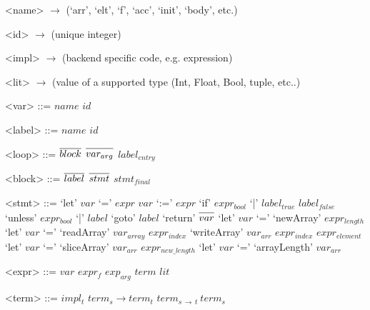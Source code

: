 \documentclass[preamble.tex]{subfiles}
\begin{document}

\setlength{\grammarindent}{5em} %
\renewcommand{\syntleft}{\normalfont\itshape} %
\renewcommand{\syntright}{}
\renewcommand{\litleft}{\ttfamily} %
\renewcommand{\litright}{}
\newcommand{\many}[1]{\overline{#1\vphantom{dummy}}} %

\renewcommand\t[1]{\mathit{#1}}

\setlength{\grammarparsep}{0pt} %

\begin{grammar}
<name> $\rightarrow$ (`arr', `elt', `f', `acc', `init', `body', etc.)

<id>   $\rightarrow$ (unique integer\footnotemark)

<impl> $\rightarrow$ (backend specific code, e.g.  expression)

<lit>  $\rightarrow$ (\Haskell value of a supported type (Int, Float, Bool, tuple, etc..)

<var>  ::= $name$ $id$

<label> ::= $name$ $id$

\end{grammar}

\setlength{\grammarparsep}{10pt plus 1pt minus 1pt} %
\begin{grammar}
<loop> ::= $\many{block}$ $\many{var_{arg}}$ $label_{entry}$

<block> ::= $\many{label}$ $\many{stmt}$ $stmt_\t{final}$

<stmt> ::= `let' $var$ `=' $expr$
      \alt $var$ `:=' $expr$
      \alt `if' $expr_{bool}$ `|' $label_{true}$ $label_\t{false}$
      \alt `unless' $expr_{bool}$ `|' $label$
      \alt `goto' $label$
      \alt `return' $\many{var}$
      \alt `let' $var$ `=' `newArray' $expr_{length}$
      \alt `let' $var$ `=' `readArray' $var_{array}$ $expr_{index}$
      \alt `writeArray' $var_{arr}$ $expr_{index}$ $expr_{element}$
      \alt `let' $var$ `=' `sliceArray' $var_{arr}$ $expr_{new\_length}$
      \alt `let' $var$ `=' `arrayLength' $var_{arr}$

<expr> ::= $var$
      \alt $expr_{\mathit{f}}$ $exp_{arg}$
      \alt $term$
      \alt $lit$

<term> ::= $impl_{t}$
      \alt $term_{s} \rightarrow term_{t}$
      \alt $term_{s\, \rightarrow\, t}\ term_{s}$

\end{grammar}
\end{document}
